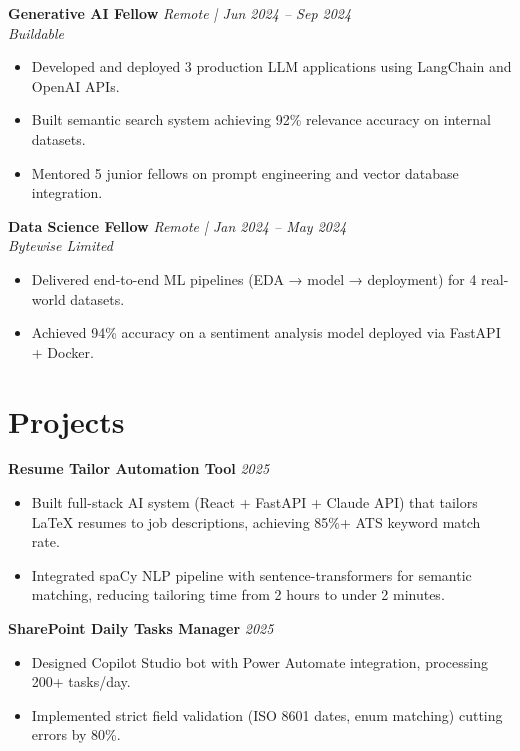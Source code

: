 \documentclass[10pt,a4paper]{article}
\newcommand{\cvevent}[4]{%
  \textbf{#1} \hfill \textit{#3 | #4} \\
  \textit{#2}
}
\begin{document}
\vspace{4pt}
\cvevent{Generative AI Fellow}{Buildable}{Remote}{Jun 2024 -- Sep 2024}
\begin{itemize}[leftmargin=*,noitemsep]
  \item Developed and deployed 3 production LLM applications using LangChain and OpenAI APIs.
  \item Built semantic search system achieving 92\% relevance accuracy on internal datasets.
  \item Mentored 5 junior fellows on prompt engineering and vector database integration.
\end{itemize}

\vspace{4pt}
\cvevent{Data Science Fellow}{Bytewise Limited}{Remote}{Jan 2024 -- May 2024}
\begin{itemize}[leftmargin=*,noitemsep]
  \item Delivered end-to-end ML pipelines (EDA → model → deployment) for 4 real-world datasets.
  \item Achieved 94\% accuracy on a sentiment analysis model deployed via FastAPI + Docker.
\end{itemize}

\section{Projects}

\textbf{Resume Tailor Automation Tool} \hfill \textit{2025}
\begin{itemize}[leftmargin=*,noitemsep]
  \item Built full-stack AI system (React + FastAPI + Claude API) that tailors LaTeX resumes
        to job descriptions, achieving 85\%+ ATS keyword match rate.
  \item Integrated spaCy NLP pipeline with sentence-transformers for semantic matching,
        reducing tailoring time from 2 hours to under 2 minutes.
\end{itemize}

\vspace{4pt}
\textbf{SharePoint Daily Tasks Manager} \hfill \textit{2025}
\begin{itemize}[leftmargin=*,noitemsep]
  \item Designed Copilot Studio bot with Power Automate integration, processing 200+ tasks/day.
  \item Implemented strict field validation (ISO 8601 dates, enum matching) cutting errors by 80\%.
\end{itemize}
\end{document}
